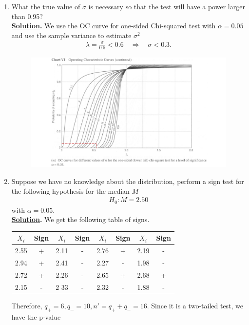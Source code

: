 \begin{enumerate}
	\item What the true value of $\sigma$ is necessary so that the test will have a power larger than 0.95? \\
	\textbf{\underline{Solution}.} We use the OC curve for one-sided Chi-squared test with $\alpha = 0.05$ and use the sample variance to estimate $\sigma^2$
	\begin{align*}
	\lambda = \frac{\sigma}{0.5} < 0.6\quad\Rightarrow\quad \sigma < 0.3.
	\end{align*}
	\begin{figure}[H]
		\centering
		\includegraphics[width=\linewidth]{./images/s5fig2.pdf}
	\end{figure}
	\item Suppose we have no knowledge about the distribution, perform a sign test for the following hypothesis for the median $M$
	\begin{align*}
	H_0: M = 2.50
	\end{align*}
	with $\alpha = 0.05$. \\
	\textbf{\underline{Solution}.} We get the following table of signs.
	\begin{table}[H]
		\centering
		\begin{tabular}{cc|cc|cc|cc}
			\hline
			$X_i$ & Sign & $X_i$ & Sign & $X_i$ & Sign & $X_i$ & Sign \\
			\hline
			2.55 & + & 2.11 & - & 2.76 & + & 2.19 & - \\
			2.94 & + & 2.41 & - & 2.27 & - & 1.98 & - \\
			2.72 & + & 2.26 & - & 2.65 & + & 2.68 & + \\
			2.15 & - & 2 33 & - & 2.32 & - & 1.88 & - \\
			\hline
		\end{tabular}
	\end{table}
	Therefore, $q_+ = 6, q_- = 10, n' = q_+ + q_- = 16$. Since it is a two-tailed test, we have the p-value

\end{enumerate}
